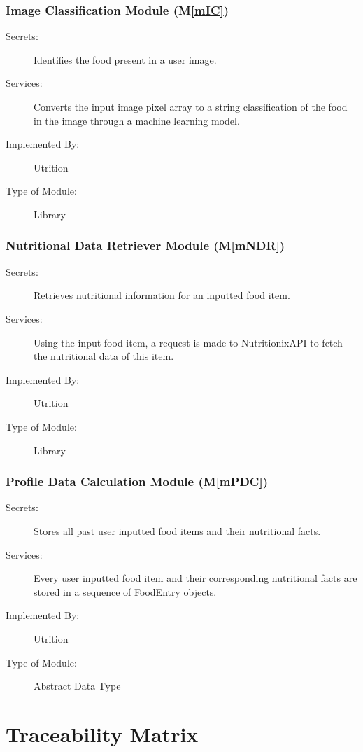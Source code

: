 \documentclass[12pt, titlepage]{article}
\newcommand{\mref}[1]{M\ref{#1}}
\begin{document}
\subsubsection{Image Classification Module (\mref{mIC})}

\begin{description}
\item[Secrets:] Identifies the food present in a user image.
\item[Services:]Converts the input image pixel array to a string classification 
of the food in the image through a machine 
learning model.
\item[Implemented By:] Utrition
\item[Type of Module:] Library
\end{description}

\subsubsection{Nutritional Data Retriever Module (\mref{mNDR})}

\begin{description}
	\item[Secrets:]Retrieves nutritional information for an inputted food item.
	\item[Services:]Using the input food item, a request is made to NutritionixAPI to fetch the nutritional data of this item.
	\item[Implemented By:] Utrition
	\item[Type of Module:] Library
\end{description}

\subsubsection{Profile Data Calculation Module (\mref{mPDC})}

\begin{description}
	\item[Secrets:]Stores all past user inputted food items and their 
	nutritional facts.
	\item[Services:]Every user inputted food item and their corresponding 
	nutritional facts are stored in a sequence of FoodEntry objects.
	\item[Implemented By:] Utrition
	\item[Type of Module:] Abstract Data Type
\end{description}

\section{Traceability Matrix} \label{SecTM}
\end{document}
